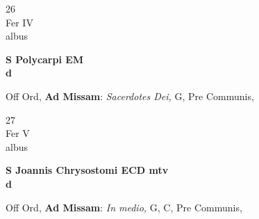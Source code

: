 \documentclass[10pt, openany]{book}
\begin{document}
        \begin{center}
            \begin{minipage}{3.5in}
                \vspace{2em}
                \begin{minipage}{0.5in}
                    {\Huge 26} \\
                    {\normalsize Fer IV} \\
                    {\normalsize albus}
                \end{minipage}
                \begin{minipage}{3.0in}
                    \textbf{ \large S Polycarpi EM \\
                    \textnormal{\normalsize d}} \\ 
                \end{minipage}
                \begin{justify}Off Ord, \textbf{Ad Missam}: \textit{Sacerdotes Dei,} G, Pre Communis,   
                \end{justify}
            \end{minipage}
        \end{center}
    
        \begin{center}
            \begin{minipage}{3.5in}
                \vspace{2em}
                \begin{minipage}{0.5in}
                    {\Huge 27} \\
                    {\normalsize Fer V} \\
                    {\normalsize albus}
                \end{minipage}
                \begin{minipage}{3.0in}
                    \textbf{ \large S Joannis Chrysostomi ECD mtv \\
                    \textnormal{\normalsize d}} \\ 
                \end{minipage}
                \begin{justify}Off Ord, \textbf{Ad Missam}: \textit{In medio,} G, C, Pre Communis,   
                \end{justify}
            \end{minipage}
        \end{center}
    
\end{document}
